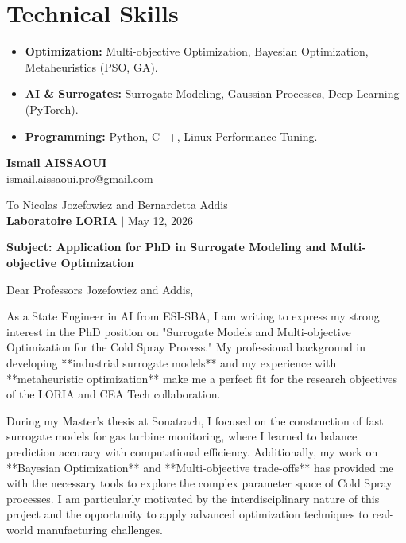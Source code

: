 \documentclass[a4paper,11pt]{article}
\begin{document}
\section{Technical Skills}
\begin{itemize}
    \item \textbf{Optimization:} Multi-objective Optimization, Bayesian Optimization, Metaheuristics (PSO, GA).
    \item \textbf{AI \& Surrogates:} Surrogate Modeling, Gaussian Processes, Deep Learning (PyTorch).
    \item \textbf{Programming:} Python, C++, Linux Performance Tuning.
\end{itemize}

\newpage

\begin{flushleft}
    \textbf{Ismail AISSAOUI} \\
    \href{mailto:ismail.aissaoui.pro@gmail.com}{ismail.aissaoui.pro@gmail.com}
\end{flushleft}

\begin{flushright}
    To Nicolas Jozefowiez and Bernardetta Addis \\
    \textbf{Laboratoire LORIA} $|$ May 12, 2026
\end{flushright}

\bigskip
\noindent \textbf{Subject: Application for PhD in Surrogate Modeling and Multi-objective Optimization}
\bigskip

Dear Professors Jozefowiez and Addis,

As a State Engineer in AI from ESI-SBA, I am writing to express my strong interest in the PhD position on "Surrogate Models and Multi-objective Optimization for the Cold Spray Process." My professional background in developing **industrial surrogate models** and my experience with **metaheuristic optimization** make me a perfect fit for the research objectives of the LORIA and CEA Tech collaboration.

During my Master's thesis at Sonatrach, I focused on the construction of fast surrogate models for gas turbine monitoring, where I learned to balance prediction accuracy with computational efficiency. Additionally, my work on **Bayesian Optimization** and **Multi-objective trade-offs** has provided me with the necessary tools to explore the complex parameter space of Cold Spray processes. I am particularly motivated by the interdisciplinary nature of this project and the opportunity to apply advanced optimization techniques to real-world manufacturing challenges.
\end{document}
